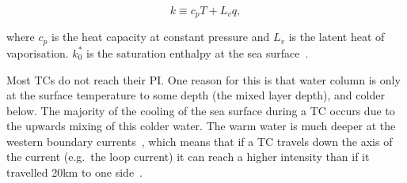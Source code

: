 \begin{equation}
k \equiv c_{p} T+L_{v} q,
\label{eq:enthalpy_per_unit_mass}
\end{equation}



where $c_p$ is the heat capacity at constant pressure and $L_{v}$ is the latent heat
of vaporisation. $k_{0}^{*}$ is the saturation enthalpy at the sea
surface~\cite{emanuel2018progress}.%






Most TCs do not reach their PI.
One reason for this is that
water column is only at the surface temperature
to some depth (the mixed layer depth), and colder below.
The majority of the cooling of
the sea surface during a TC occurs due to the
upwards mixing of this colder water.
The warm water
is much deeper at the western boundary currents~\cite{hogg1995western},
which means that if a TC
travels down the axis of the current (e.g.~the loop current)
it can reach a higher intensity than
if it travelled 20km to one side~\cite{emanuel2005divine}.
